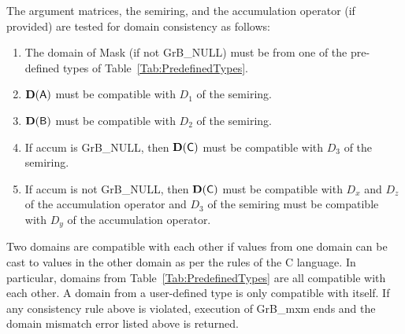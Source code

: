 The argument matrices, the semiring, and the accumulation operator (if provided) are tested for domain consistency
as follows:
\begin{enumerate}
	\item The domain of {\sf Mask} (if not {\sf GrB\_NULL}) must be from one of the pre-defined types of Table~\ref{Tab:PredefinedTypes}.

	\item $\bold{D}({\sf A})$ must be compatible with $D_1$ of the semiring.

	\item $\bold{D}({\sf B})$ must be compatible with $D_2$ of the semiring.

	\item If {\sf accum} is {\sf GrB\_NULL}, then $\bold{D}({\sf C})$ must be compatible with $D_3$ of the semiring.

	\item If {\sf accum} is not {\sf GrB\_NULL}, then $\bold{D}({\sf C})$ must be compatible with $D_x$ and $D_z$ of the 
	accumulation operator and $D_3$ of the semiring must be compatible with $D_y$ of the accumulation operator.
\end{enumerate}
Two domains are compatible with each other if values from one domain can be cast to values in the other domain as per the rules of the C language.
In particular, domains from Table~\ref{Tab:PredefinedTypes} are all compatible with each other. A domain from a user-defined type is only compatible with itself.
If any consistency rule above is violated, execution of {\sf GrB\_mxm} ends and the domain mismatch error listed above is returned.


